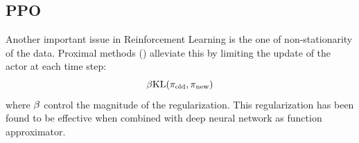\subsection{PPO}
Another important issue in Reinforcement Learning is the one of non-stationarity of the data.
Proximal methods (\cite{schulman2017proximal,schulman2015trust}) alleviate this by limiting the update of the actor at each time step:
\begin{equation}
    \beta \text{KL}(\pi_{\text{old}},\pi_{\text{new}})
\end{equation}
where $\beta$ control the magnitude of the regularization. This regularization has been found to be effective when combined with deep neural network as function approximator.
